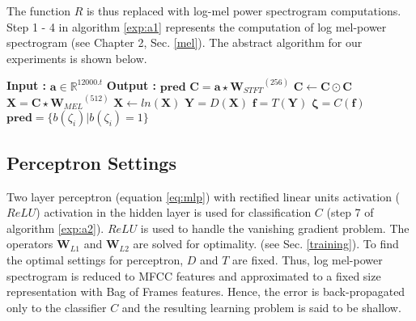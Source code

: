 \noindent The function $R$ is thus replaced with log-mel power spectrogram computations. Step 1 - 4 in algorithm \ref{exp:a1} represents the computation of log mel-power spectrogram (see Chapter 2, Sec. \ref{mel}). The abstract algorithm for our experiments is shown below.  
\begin{algorithm}
  \caption{$\textbf{pred}$ = $Model$($\textbf{a}$) }\label{exp:a1}
  \begin{algorithmic}[1]
    \Statex \textbf{Input :} $\textbf{a} \in \mathbb{R}^{12000.t}$
    \Statex \textbf{Output :} $\textbf{pred}$ 
    \State $\textbf{C} = \textbf{a} \star {\textbf{W}_{STFT}}^{(256)}$ 
    \State $\textbf{C} \leftarrow \textbf{C} \odot \textbf{C}$
    \State $\textbf{X} = \textbf{C} \star {\textbf{W}_{MEL}}^{(512)}$ 
    \State $\textbf{X} \leftarrow ln(\textbf{X})$
    \State $\textbf{Y} = D(\textbf{X})$ 
    \State $\textbf{f} = T(\textbf{Y})$ 
    \State $\bm{\zeta} = C(\textbf{f})$ 
    \State $\textbf{pred} = \{ b(\zeta_{i}) | b(\zeta_{i}) = 1 \}$ 
  \end{algorithmic}
\end{algorithm}
\FloatBarrier

\subsection{Perceptron Settings}
Two layer perceptron (equation \ref{eq:mlp}) with rectified linear units activation ($ReLU$) activation in the hidden layer is used for classification $C$ (step 7 of algorithm \ref{exp:a2}). $ReLU$ is used to handle the vanishing gradient problem. The operators $\textbf{W}_{L1}$ and $\textbf{W}_{L2}$ are solved for optimality. (see Sec. \ref{training}). To find the optimal settings for perceptron, $D$ and $T$ are fixed. Thus, log mel-power spectrogram is reduced to MFCC features and approximated to a fixed size representation with Bag of Frames features. Hence, the error is back-propagated only to the classifier $C$ and the resulting learning problem is said to be shallow.  

